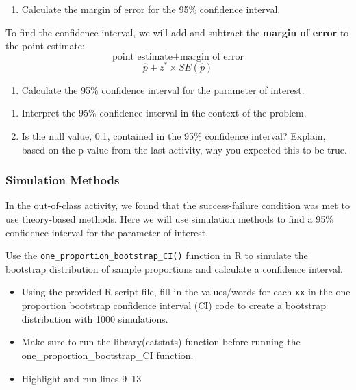 \documentclass[
]{report}
\providecommand{\tightlist}{%
  \setlength{\itemsep}{0pt}\setlength{\parskip}{0pt}}
\begin{document}
\begin{enumerate}
\def\labelenumi{\arabic{enumi}.}
\setcounter{enumi}{3}
\tightlist
\item
  Calculate the margin of error for the 95\% confidence interval.
  \vspace{0.6in}
\end{enumerate}

To find the confidence interval, we will add and subtract the \textbf{margin of error} to the point estimate:
\[\text{point estimate}\pm\text{margin of error}\]
\[\hat{p}\pm z^* \times SE(\hat{p})\]

\begin{enumerate}
\def\labelenumi{\arabic{enumi}.}
\setcounter{enumi}{4}
\tightlist
\item
  Calculate the 95\% confidence interval for the parameter of interest.
  \vspace{0.6in}
\end{enumerate}

\newpage

\begin{enumerate}
\def\labelenumi{\arabic{enumi}.}
\setcounter{enumi}{5}
\item
  Interpret the 95\% confidence interval in the context of the problem.
  \vspace{1in}
\item
  Is the null value, 0.1, contained in the 95\% confidence interval? Explain, based on the p-value from the last activity, why you expected this to be true.
  \vspace{0.6in}
\end{enumerate}

\hypertarget{simulation-methods}{%
\subsubsection*{Simulation Methods}\label{simulation-methods}}

In the out-of-class activity, we found that the success-failure condition was met to use theory-based methods. Here we will use simulation methods to find a 95\% confidence interval for the parameter of interest.

Use the \texttt{one\_proportion\_bootstrap\_CI()} function in R to simulate the bootstrap distribution of sample proportions and calculate a confidence interval.

\begin{itemize}
\item
  Using the provided R script file, fill in the values/words for each \texttt{xx} in the one proportion bootstrap confidence interval (CI) code to create a bootstrap distribution with 1000 simulations.
\item
  Make sure to run the library(catstats) function before running the one\_proportion\_bootstrap\_CI function.
\item
  Highlight and run lines 9--13
\end{itemize}
\end{document}
